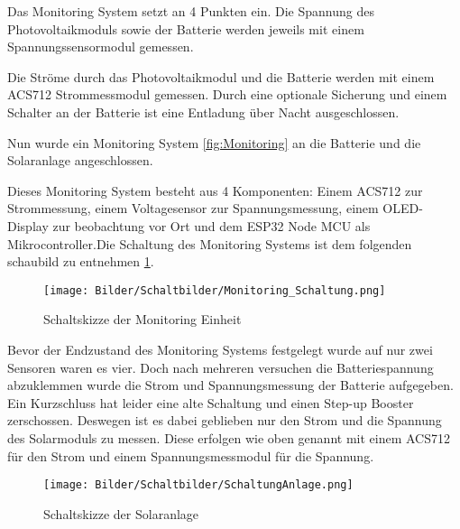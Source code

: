 \documentclass [ngerman]{mucproc}
\begin{document}
	
	
	
	Das Monitoring System setzt an 4 Punkten ein. Die Spannung des Photovoltaikmoduls sowie der Batterie werden jeweils mit einem Spannungssensormodul gemessen. 
	
	Die Ströme durch das Photovoltaikmodul und die Batterie werden mit einem ACS712 Strommessmodul gemessen. Durch eine optionale Sicherung und einem Schalter an der Batterie ist eine Entladung über Nacht ausgeschlossen.
	 
\newpage
Nun wurde ein Monitoring System \ref{fig:Monitoring} an die Batterie und die Solaranlage angeschlossen. 
		
%		
		
		Dieses Monitoring System besteht aus 4 Komponenten: Einem ACS712 zur Strommessung, einem Voltagesensor zur Spannungsmessung, einem OLED-Display zur beobachtung vor Ort und dem ESP32 Node MCU als Mikrocontroller.Die Schaltung des Monitoring Systems ist dem folgenden schaubild zu entnehmen \ref{fig:Monitoring Einheit}.

		\begin{figure}
			\centering
			\texttt{[image: Bilder/Schaltbilder/Monitoring\_Schaltung.png]}
			\caption{Schaltskizze der Monitoring Einheit}
			\label{fig:Monitoring Einheit}
		\end{figure}
		
		
		
		Bevor der Endzustand des Monitoring Systems festgelegt wurde auf nur zwei Sensoren waren es vier. Doch nach mehreren versuchen die Batteriespannung abzuklemmen wurde die Strom und Spannungsmessung der Batterie aufgegeben. Ein Kurzschluss hat leider eine alte Schaltung und einen Step-up Booster zerschossen. Deswegen ist es dabei geblieben nur den Strom und die Spannung des Solarmoduls zu messen. Diese erfolgen wie oben genannt mit einem ACS712 für den Strom und einem Spannungsmessmodul für die Spannung.

	\begin{figure}
		\centering
		\texttt{[image: Bilder/Schaltbilder/SchaltungAnlage.png]}
		\caption{Schaltskizze der Solaranlage}
		\label{fig: Schaltskizze Solaranlage alt}
	\end{figure}
	
\end{document}
